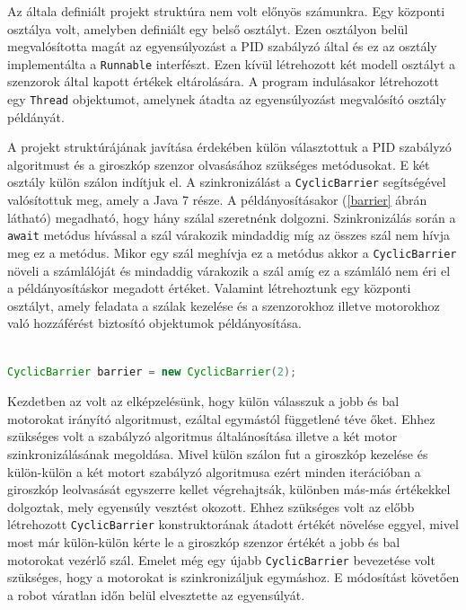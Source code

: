 Az általa definiált projekt struktúra nem volt előnyös számunkra. Egy központi osztálya volt, amelyben definiált egy belső osztályt. Ezen osztályon belül megvalósította magát az egyensúlyozást a PID szabályzó által és ez az osztály implementálta a \texttt{Runnable} interfészt. Ezen kívül létrehozott két modell osztályt a szenzorok által kapott értékek eltárolására. A program indulásakor létrehozott egy \texttt{Thread} objektumot, amelynek átadta az egyensúlyozást megvalósító osztály példányát. 

A projekt struktúrájának javítása érdekében külön választottuk a PID szabályzó algoritmust és a giroszkóp szenzor olvasásához szükséges metódusokat. E két osztály külön szálon indítjuk el. A szinkronizálást a \texttt{CyclicBarrier} segítségével valósítottuk meg, amely a Java 7 része. A példányosításakor (\ref{barrier} ábrán látható) megadható, hogy hány szálal szeretnénk dolgozni. Szinkronizálás során a \texttt{await} metódus hívással a szál várakozik mindaddig míg az összes szál nem hívja meg ez a metódus. Mikor egy szál meghívja ez a metódus akkor a \texttt{CyclicBarrier} növeli a számlálóját és mindaddig várakozik a szál amíg ez a számláló nem éri el a példányosításkor megadott értéket. Valamint létrehoztunk egy központi osztályt, amely feladata a szálak kezelése és a szenzorokhoz illetve motorokhoz való hozzáférést biztosító objektumok példányosítása.

\begin{lstlisting}[label=barrier, caption= CyclicBarrier példányosítása , language=Java]

CyclicBarrier barrier = new CyclicBarrier(2);

\end{lstlisting}

Kezdetben az volt az elképzelésünk, hogy külön válasszuk a jobb és bal motorokat irányító algoritmust, ezáltal egymástól függetlené téve őket. Ehhez szükséges volt a szabályzó algoritmus általánosítása illetve a két motor szinkronizálásának megoldása. Mivel külön szálon fut a giroszkóp kezelése és külön-külön a két motort szabályzó algoritmusa ezért minden iterációban a giroszkóp leolvasását egyszerre kellet végrehajtsák, különben más-más értékekkel dolgoztak, mely egyensúly vesztést okozott. Ehhez szükséges volt az előbb létrehozott \texttt{CyclicBarrier} konstruktorának átadott értékét növelése eggyel, mivel most már külön-külön kérte le a giroszkóp szenzor értékét a jobb és bal motorokat vezérlő szál. Emelet még egy újabb \texttt{CyclicBarrier} bevezetése volt szükséges, hogy a motorokat is szinkronizáljuk egymáshoz. E módosítást követően a robot váratlan időn belül elvesztette az egyensúlyát.

